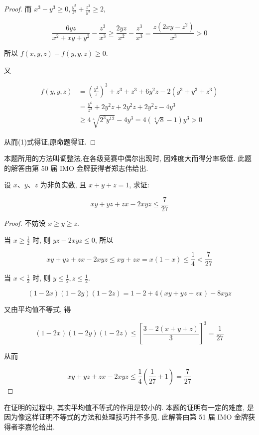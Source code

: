\begin{proof}
	而 $x^{3}-y^{3} \geqslant 0, \frac{y^{3}}{z^{3}}+\frac{z^{3}}{y^{3}} \geqslant 2$,
	
	$$
	\frac{6 y z}{x^{2}+x y+y^{2}}-\frac{z^{3}}{x^{3}} \geqslant \frac{2 y z}{x^{2}}-\frac{z^{3}}{x^{3}}=\frac{z\left(2 x y-z^{2}\right)}{x^{3}}>0
	$$
	
	所以 $f(x, y, z)-f(y, y, z) \geqslant 0$.
	
	又
	
	$$
	\begin{aligned}
	f(y, y, z) & =\left(\frac{y^{2}}{z}\right)^{3}+z^{3}+z^{3}+6 y^{2} z-2\left(y^{3}+y^{3}+z^{3}\right) \\
	& =\frac{y^{6}}{z^{3}}+2 y^{2} z+2 y^{2} z+2 y^{2} z-4 y^{3} \\
	& \geqslant 4 \sqrt[4]{2^{3} y^{12}}-4 y^{3}=4(\sqrt[4]{8}-1) y^{3}>0
	\end{aligned}
	$$
	
	从而(1)式得证,原命题得证.
\end{proof}
\begin{note}
	本题所用的方法叫调整法,在各级竞赛中偶尔出现时, 因难度大而得分率极低. 此题的解答由第 50 届 IMO 金牌获得者郑志伟给出.
\end{note}

\begin{example}
	设 $x 、 y 、 z$ 为非负实数, 且 $x+y+z=1$, 求证:
	
	$$
	x y+y z+z x-2 x y z \leqslant \frac{7}{27}
	$$
\end{example}
\begin{proof}
	不妨设 $x \geqslant y \geqslant z$.
	
	当 $x \geqslant \frac{1}{2}$ 时, 则 $y z-2 x y z \leqslant 0$, 所以
	
	$$
	x y+y z+z x-2 x y z \leqslant x y+z x=x(1-x) \leqslant \frac{1}{4}<\frac{7}{27}
	$$
	
	当 $x<\frac{1}{2}$ 时, 则 $y \leqslant \frac{1}{2}, z \leqslant \frac{1}{2}$.
	
	$$
	(1-2 x)(1-2 y)(1-2 z)=1-2+4(x y+y z+z x)-8 x y z
	$$
	
	又由平均值不等式, 得
	
	$$
	(1-2 x)(1-2 y)(1-2 z) \leqslant\left[\frac{3-2(x+y+z)}{3}\right]^{3}=\frac{1}{27}
	$$
	
	从而
	
	$$
	x y+y z+z x-2 x y z \leqslant \frac{1}{4}\left(\frac{1}{27}+1\right)=\frac{7}{27}
	$$
\end{proof}
\begin{note}
	在证明的过程中, 其实平均值不等式的作用是较小的. 本题的证明有一定的难度, 是因为像这样证明不等式的方法和处理技巧并不多见. 此解答由第 51 届 IMO 金牌获得者李嘉伦给出.
\end{note}

